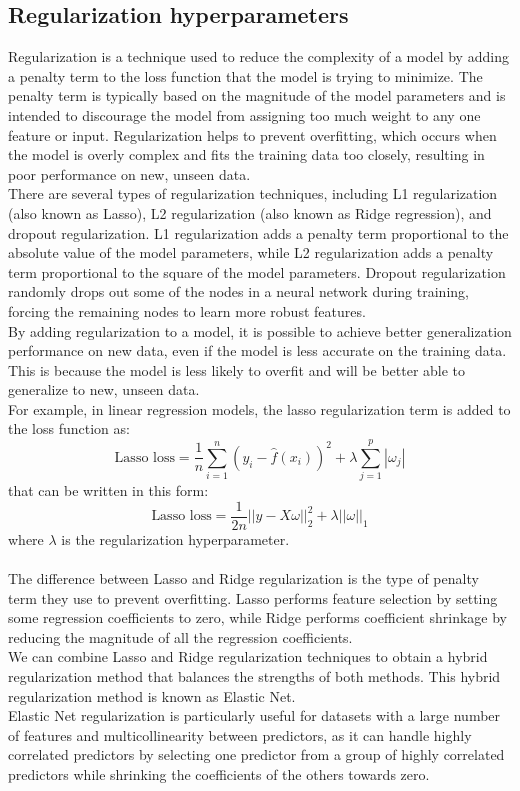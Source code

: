 \documentclass{article}
\begin{document}
\subsection{Regularization hyperparameters}
Regularization is a technique used to reduce the complexity of a model by adding a penalty term to the loss function that the model is trying to minimize. The penalty term is typically based on the magnitude of the model parameters and is intended to discourage the model from assigning too much weight to any one feature or input. Regularization helps to prevent overfitting, which occurs when the model is overly complex and fits the training data too closely, resulting in poor performance on new, unseen data.\\
There are several types of regularization techniques, including L1 regularization (also known as Lasso), L2 regularization (also known as Ridge regression), and dropout regularization. L1 regularization adds a penalty term proportional to the absolute value of the model parameters, while L2 regularization adds a penalty term proportional to the square of the model parameters. Dropout regularization randomly drops out some of the nodes in a neural network during training, forcing the remaining nodes to learn more robust features.\\
By adding regularization to a model, it is possible to achieve better generalization performance on new data, even if the model is less accurate on the training data. This is because the model is less likely to overfit and will be better able to generalize to new, unseen data.\\
\noindent For example, in linear regression models, the lasso regularization term is added to the loss function as:
\[\text{Lasso loss} = \frac{1}{n} \sum_{i=1}^n (y_i - \hat{f}(x_i))^2 + \lambda \sum_{j=1}^p |\omega_j|\]
that can be written in this form:
\[\text{Lasso loss} = \frac{1}{2n} ||y - X\omega||_2^2 + \lambda ||\omega||_1\]
where $\lambda$ is the regularization hyperparameter.\\\\
The difference between Lasso and Ridge regularization is the type of penalty term they use to prevent overfitting.
Lasso performs feature selection by setting some regression coefficients to zero, while Ridge performs coefficient shrinkage by reducing the magnitude of all the regression coefficients.\\
We can combine Lasso and Ridge regularization techniques to obtain a hybrid regularization method that balances the strengths of both methods.
This hybrid regularization method is known as Elastic Net.\\
Elastic Net regularization is particularly useful for datasets with a large number of features and multicollinearity between predictors, as it can handle highly correlated predictors by selecting one predictor from a group of highly correlated predictors while shrinking the coefficients of the others towards zero.
\end{document}
